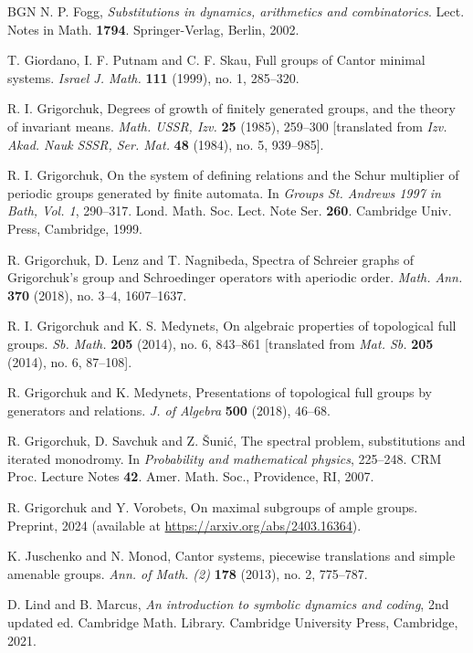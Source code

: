 \documentclass[12pt]{article}
\theoremstyle{definition}
\begin{document}
\begin{thebibliography}{BGN}
N. P. Fogg, \emph{Substitutions in dynamics, arithmetics and 
combinatorics}.  Lect. Notes in Math. \textbf{1794}.  Springer-Verlag, 
Berlin, 2002.

T. Giordano, I. F. Putnam and C. F. Skau, Full groups of Cantor minimal 
systems.  \emph{Israel J. Math.} \textbf{111} (1999), no. 1, 285--320.

R. I. Grigorchuk, Degrees of growth of finitely generated groups, and the 
theory of invariant means. \emph{Math. USSR, Izv.} \textbf{25} (1985), 
259--300 [translated from \emph{Izv. Akad. Nauk SSSR, Ser. Mat.}
\textbf{48} (1984), no. 5, 939--985].

R. I. Grigorchuk, On the system of defining relations and the Schur 
multiplier of periodic groups generated by finite automata. In \emph{Groups 
St. Andrews 1997 in Bath, Vol. 1}, 290--317.  Lond. Math. Soc. Lect. Note 
Ser. \textbf{260}.  Cambridge Univ. Press, Cambridge, 1999.

R. Grigorchuk, D. Lenz and T. Nagnibeda, Spectra of Schreier graphs of 
Grigorchuk’s group and Schroedinger operators with aperiodic order. 
\emph{Math. Ann.} \textbf{370} (2018), no. 3--4, 1607--1637.

R. I. Grigorchuk and K. S. Medynets, On algebraic properties of topological 
full groups. \emph{Sb. Math.} \textbf{205} (2014), no. 6, 843--861 
[translated from \emph{Mat. Sb.} \textbf{205} (2014), no. 6, 87--108].

R. Grigorchuk and K. Medynets, Presentations of topological full groups by 
generators and relations. \emph{J. of Algebra} \textbf{500} (2018), 46--68.

R. Grigorchuk, D. Savchuk and Z. \v{S}uni\'{c}, The spectral problem, 
substitutions and iterated monodromy. In \emph{Probability and mathematical 
physics}, 225--248. CRM Proc. Lecture Notes \textbf{42}. Amer. Math. Soc., 
Providence, RI, 2007.

R. Grigorchuk and Y. Vorobets, On maximal subgroups of ample groups.  
Preprint, 2024 (available at \url{https://arxiv.org/abs/2403.16364}).

K. Juschenko and N. Monod, Cantor systems, piecewise translations and 
simple amenable groups. \emph{Ann. of Math. (2)} \textbf{178} (2013), no. 
2, 775--787.

D. Lind and B. Marcus, \emph{An introduction to symbolic dynamics and 
coding}, 2nd updated ed.  Cambridge Math. Library.  Cambridge University 
Press, Cambridge, 2021.


\end{thebibliography}
\end{document}

